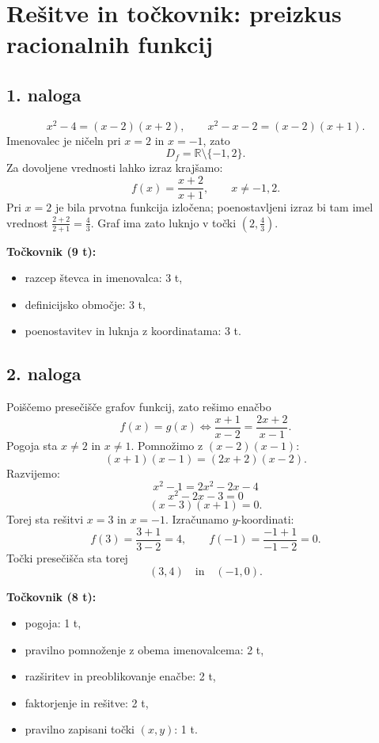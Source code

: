 \documentclass[11pt]{article}
\begin{document}
\renewcommand{\arraystretch}{1.2}
\setlength{\parindent}{0pt}
\setlength{\parskip}{0.25em}

\section*{Rešitve in točkovnik: preizkus racionalnih funkcij}

\vspace{0.25em}

\subsection*{1. naloga}
\vspace{0.2em}

\[
 x^2-4=(x-2)(x+2),\qquad x^2-x-2=(x-2)(x+1).
\]
Imenovalec je ničeln pri $x=2$ in $x=-1$, zato
\[
 D_f=\mathbb{R}\setminus\{-1,2\}.
\]
Za dovoljene vrednosti lahko izraz krajšamo:
\[
 f(x)=\frac{x+2}{x+1},\qquad x\ne -1,2.
\]
Pri $x=2$ je bila prvotna funkcija izločena; poenostavljeni izraz bi tam imel vrednost $\frac{2+2}{2+1}=\frac{4}{3}$. Graf ima zato luknjo v točki $\left(2,\frac{4}{3}\right)$.

\vspace{0.5em}
\textbf{Točkovnik (9 t):}
\begin{itemize}[leftmargin=2.5em]
  \item razcep števca in imenovalca: 3 t,
  \item definicijsko območje: 3 t,
  \item poenostavitev in luknja z koordinatama: 3 t.
\end{itemize}

\subsection*{2. naloga}
\vspace{0.2em}

Poiščemo presečišče grafov funkcij, zato rešimo enačbo
\[
 f(x)=g(x)
 \iff \frac{x+1}{x-2}=\frac{2x+2}{x-1}.
\]
Pogoja sta $x\ne 2$ in $x\ne 1$. Pomnožimo z $(x-2)(x-1)$:
\[
 (x+1)(x-1)=(2x+2)(x-2).
\]
Razvijemo:
\[
 x^2-1=2x^2-2x-4
\]
\[
 x^2-2x-3=0
\]
\[
 (x-3)(x+1)=0.
\]
Torej sta rešitvi $x=3$ in $x=-1$. Izračunamo $y$-koordinati:
\[
 f(3)=\frac{3+1}{3-2}=4,
\qquad
 f(-1)=\frac{-1+1}{-1-2}=0.
\]
Točki presečišča sta torej
\[
 \boxed{(3,4)}\quad \text{in}\quad \boxed{(-1,0)}.
\]

\textbf{Točkovnik (8 t):}
\vspace{0.35em}
\begin{itemize}[leftmargin=2.5em]
  \item pogoja: 1 t,
  \item pravilno pomnoženje z obema imenovalcema: 2 t,
  \item razširitev in preoblikovanje enačbe: 2 t,
  \item faktorjenje in rešitve: 2 t,
  \item pravilno zapisani točki $(x,y)$: 1 t.
\end{itemize}
\end{document}

